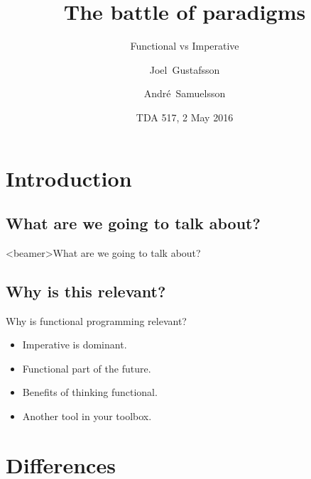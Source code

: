 \documentclass[10pt, compress, xcolor=table]{beamer}
\title{The battle of paradigms}
\subtitle{Functional vs Imperative}
\author{Joel~Gustafsson \and André~Samuelsson}
\institute[Chalmers University of Techonlogy] %
{
  Department of Computer Science\\
  Chalmers University of Technology
}
\date{TDA 517, 2 May 2016}
\begin{document}


\begin{frame}
  \titlepage
\end{frame}


\section{Introduction}

\subsection{What are we going to talk about?}

\begin{frame}<beamer>{What are we going to talk about?}
    \tableofcontents
\end{frame}

\subsection{Why is this relevant?}
\begin{frame}{Why is functional programming relevant?}
    \begin{itemize}
        \item Imperative is dominant.
        \item Functional part of the future.
        \item Benefits of thinking functional.
        \item Another tool in your toolbox.
    \end{itemize}
\end{frame}


\section{Differences}
\end{document}
